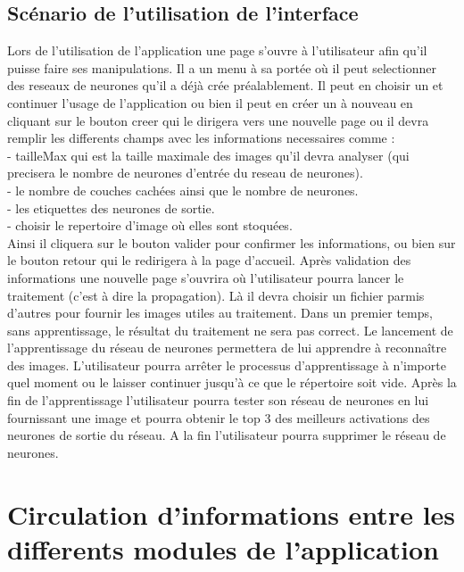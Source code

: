 \documentclass{article}
\begin{document}
		\subsection{Scénario de l'utilisation de l'interface}
	Lors de l'utilisation de l'application une page s'ouvre à l'utilisateur afin qu'il puisse faire ses manipulations. Il a un menu 
à sa portée où il peut selectionner des reseaux de neurones qu'il a déjà crée préalablement.
Il peut en choisir un et continuer l'usage de l'application ou bien il peut en créer un à nouveau en cliquant sur le bouton creer qui le dirigera vers une nouvelle page ou il devra remplir les differents champs avec les informations necessaires comme :\\ 
- tailleMax qui est la taille maximale des images qu'il devra analyser (qui precisera le nombre de neurones d'entrée du reseau de neurones).\\
- le nombre de couches cachées ainsi que le nombre de neurones.\\
- les etiquettes des neurones de sortie.\\
- choisir le repertoire d'image où elles sont stoquées.\\
 Ainsi il cliquera sur le bouton valider pour confirmer les informations, ou bien sur le bouton retour qui le redirigera à la page d'accueil.
Après validation des informations une nouvelle page s'ouvrira où l'utilisateur pourra lancer le traitement (c'est à dire la propagation). 
Là il devra choisir un fichier parmis d'autres pour fournir les images utiles au traitement.
Dans un premier temps, sans apprentissage, le résultat du traitement ne sera pas correct.
Le lancement de l'apprentissage du réseau de neurones permettera de lui apprendre à reconnaître des images. 
L'utilisateur pourra arrêter le processus d'apprentissage à n'importe quel moment ou le laisser continuer jusqu'à ce que le répertoire soit vide.
Après la fin de l'apprentissage l'utilisateur pourra tester son réseau de neurones en lui fournissant une image et pourra obtenir le top 3 des meilleurs activations des neurones de sortie du réseau. 
A la fin l'utilisateur pourra supprimer le réseau de neurones.
  
	\newpage

\section{Circulation d'informations entre les differents modules de l'application}
\end{document}
